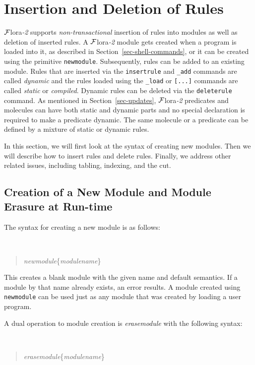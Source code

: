 \documentclass[11pt]{article}
\newcommand{\FLORA}{{\mbox{\sc ${\cal F}${lora}\rm\emph{-2}}}\xspace}
\begin{document}
\section{Insertion and Deletion of Rules}

\FLORA supports \emph{non-transactional} insertion of rules into modules as
well as deletion of inserted rules.  A \FLORA module gets created when a
program is loaded into it, as described in
Section~\ref{sec-shell-commands}, or it can be created using the primitive
{\tt newmodule}. Subsequently, rules can be added to an existing module.
Rules that are inserted via the {\tt insertrule} and {\tt \_add} commands
are called \emph{dynamic} and the rules loaded using the {\tt \_load} or
{\tt [...]} commands are called \emph{static} or \emph{compiled}.  Dynamic
rules can be deleted via the {\tt deleterule} command. As mentioned in
Section~\ref{sec-updates}, \FLORA predicates and molecules can have both
static and dynamic parts and no special declaration is required to make a
predicate dynamic. The same molecule or a predicate can be defined by a
mixture of static or dynamic rules.

In this section, we will first look at the syntax of creating new
modules.  Then we will describe how to insert rules and delete
rules. Finally, we address other related issues, including tabling,
indexing, and the cut.


\subsection{Creation of a New Module and Module Erasure at Run-time}


The syntax for creating a new module is as follows:
{\tt
\begin{quote}
\emph{newmodule}\{\emph{modulename}\}
\end{quote}
}
\noindent
This creates a blank module with the given name and default semantics.  If
a module by that name already exists, an error results.  A module created
using {\tt newmodule} can be used just as any module that
was created by loading a user program.

A dual operation to module creation
is \emph{erasemodule} with the following syntax:
{\tt
\begin{quote}
\emph{erasemodule}\{\emph{modulename}\}
\end{quote}
}
\end{document}
